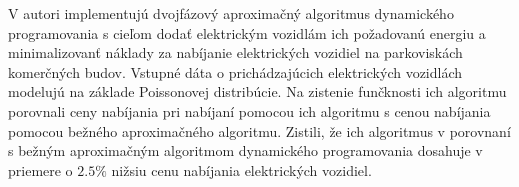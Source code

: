     V \cite{Zhang2018RealTimeSC} autori implementujú dvojfázový aproximačný algoritmus dynamického programovania s cieľom dodať elektrickým vozidlám ich požadovanú energiu a minimalizovanť náklady za nabíjanie elektrických vozidiel na parkoviskách komerčných budov. Vstupné dáta o prichádzajúcich elektrických vozidlách modelujú na základe Poissonovej distribúcie. Na zistenie funčknosti ich algoritmu porovnali ceny nabíjania pri nabíjaní pomocou ich algoritmu s cenou nabíjania pomocou bežného aproximačného algoritmu. Zistili, že ich algoritmus v porovnaní s bežným aproximačným algoritmom dynamického programovania dosahuje v priemere o $2.5\%$ nižsiu cenu nabíjania elektrických vozidiel.





















